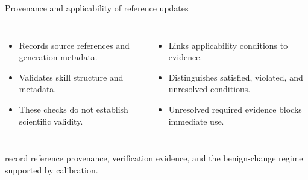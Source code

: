 \begin{frame}[t]{Provenance and applicability of reference updates}
\vspace{0.1cm}
\begin{columns}[T,onlytextwidth]
{\small
\begin{itemize}\setlength\itemsep{0.5em}
\item Records source references and generation metadata.
\item Validates skill structure and metadata.
\item These checks do not establish scientific validity.
\end{itemize}}
{\small
\begin{itemize}\setlength\itemsep{0.5em}
\item Links applicability conditions to evidence.
\item Distinguishes satisfied, violated, and unresolved conditions.
\item Unresolved required evidence blocks immediate use.
\end{itemize}}
\end{columns}
\par\vspace{0.2cm}
{\small{} record reference provenance, verification evidence, and the benign-change regime supported by calibration.\par}
\vspace{0.1cm}
\end{frame}
